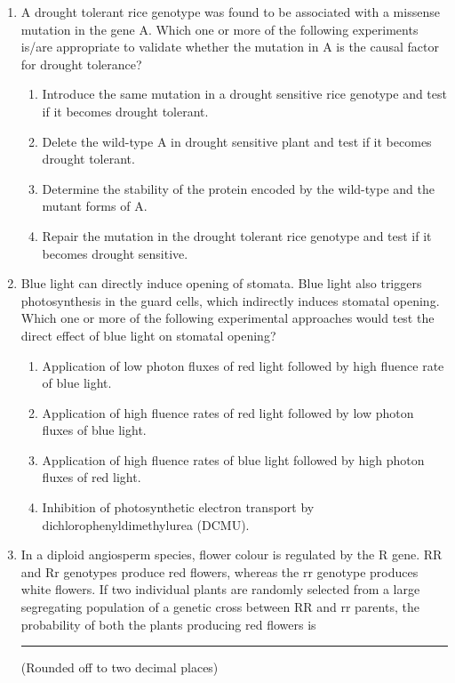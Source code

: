 \documentclass[journal,12pt,onecolumn]{IEEEtran}
\begin{document}
\begin{enumerate}
    \item A drought tolerant rice genotype was found to be associated with a missense mutation in the gene A. Which one or more of the following experiments is/are appropriate to validate whether the mutation in A is the causal factor for drought tolerance?
    \begin{enumerate}
        \item Introduce the same mutation in a drought sensitive rice genotype and test if it becomes drought tolerant.
        \item Delete the wild-type A in drought sensitive plant and test if it becomes drought tolerant.
        \item Determine the stability of the protein encoded by the wild-type and the mutant forms of A.
        \item Repair the mutation in the drought tolerant rice genotype and test if it becomes drought sensitive.
    \end{enumerate}

    \item Blue light can directly induce opening of stomata. Blue light also triggers photosynthesis in the guard cells, which indirectly induces stomatal opening. Which one or more of the following experimental approaches would test the direct effect of blue light on stomatal opening?
    \begin{enumerate}
        \item Application of low photon fluxes of red light followed by high fluence rate of blue light.
        \item Application of high fluence rates of red light followed by low photon fluxes of blue light.
        \item Application of high fluence rates of blue light followed by high photon fluxes of red light.
        \item Inhibition of photosynthetic electron transport by dichlorophenyldimethylurea (DCMU).
    \end{enumerate}

    \item In a diploid angiosperm species, flower colour is regulated by the R gene. RR and Rr genotypes produce red flowers, whereas the rr genotype produces white flowers. If two individual plants are randomly selected from a large segregating population of a genetic cross between RR and rr parents, the probability of both the plants producing red flowers is \rule{1 cm}{0.15 mm} (Rounded off to two decimal places)


\end{enumerate}
\end{document}
